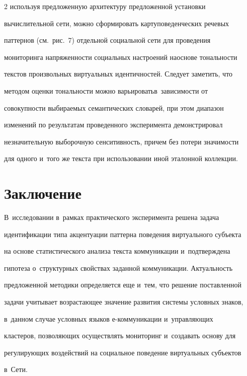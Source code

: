 \begin{multicols}{2}
используя предложенную архитектуру предложенной установки 

вычислительной сети, можно сформировать карту\linebreak поведенческих речевых 

паттернов (см.\ рис.~7) отдельной социальной сети для проведения 

мониторинга напряженности социальных настроений на\linebreak основе тональности 

текстов произвольных виртуальных идентичностей. Следует заметить, что 

методом оценки тональности можно варьировать\linebreak в~зависимости от 

совокупности выбираемых семантических словарей, при этом диапазон 

изменений по результатам проведенного эксперимента демонстрировал 

незначительную выборочную сенситивность, причем без потери значимости 

для одного и~того же текста при использовании иной эталонной коллекции.



\section{Заключение}



  В~исследовании в~рамках практического эксперимента решена задача 

идентификации типа акцентуации паттерна поведения виртуального субъекта 

на основе статистического анализа текста коммуникации и~подтверждена 

гипотеза о~структурных свойствах заданной коммуникации. Актуальность 

предложенной методики определяется еще и~тем, что решение поставленной 

задачи учитывает возрастающее значение развития системы условных знаков, 

в~данном случае условных языков е-ком\-му\-ни\-ка\-ции и~управляющих 

кластеров, позволяющих осуществлять мониторинг и~создавать основу для 

регулирующих воздействий на социальное поведение виртуальных субъектов 

в~Сети.


\end{multicols}

